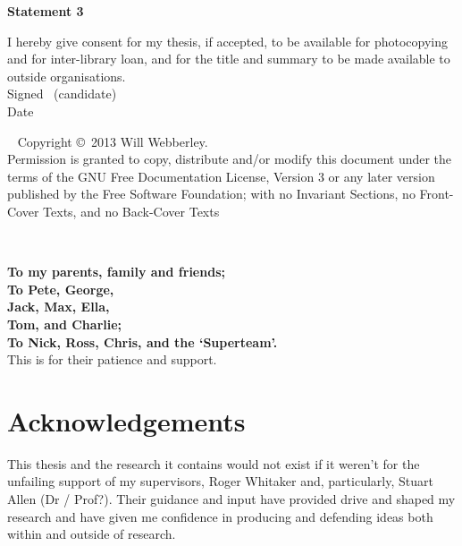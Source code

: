\vfill

\textbf{\large Statement 3}

I hereby give consent for my thesis, if accepted, to be available for photocopying and for inter-library loan,
 and for the title and summary to be made available to outside organisations.\\[2ex]
Signed \dotfill \ (candidate) \hspace*{10em}\\[1ex]
Date\ \ \ \ \ \dotfill \hspace*{18em}

\vfill

\cleardoublepage


\thispagestyle{plain}
\ \vfill{\small
Copyright \copyright\ 2013 Will Webberley.\\
Permission is granted to copy, distribute and/or modify this document
under the terms of the GNU Free Documentation License, Version 3 or
any later version published by the Free Software Foundation; with no
Invariant Sections, no Front-Cover Texts, and no Back-Cover Texts}\\[3.5ex]
\cleardoublepage


\ \vspace*{1.11cm}
\begin{flushright}
\textbf{\large To my parents, family and friends;}\\
\textbf{\large To Pete, George,}\\
\textbf{\large Jack, Max, Ella,}\\
\textbf{\large Tom, and Charlie;}\\
\textbf{\large To Nick, Ross, Chris, and the `Superteam'.}\\
\large This is for their patience and support.
\end{flushright}
\newpage
\markboth{}{}
\cleardoublepage

\chapter*{Acknowledgements}

This thesis and the research it contains would not exist if it weren't for the unfailing support of my supervisors, Roger Whitaker and, particularly, Stuart Allen (Dr / Prof?). Their guidance and input have provided drive and shaped my research and have given me confidence in producing and defending ideas both within and outside of research.

